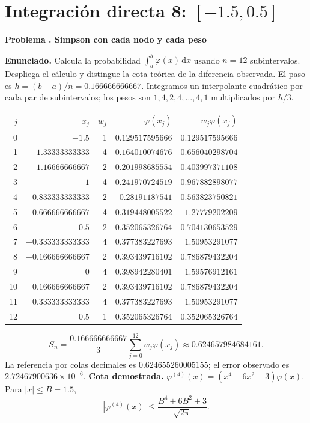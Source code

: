 \documentclass[11pt,a4paper]{article}
\newcommand{\dd}{\,\mathrm d}
\theoremstyle{definition}
\newcounter{problema}
\newenvironment{resuelto}[1]{\refstepcounter{problema}\par\medskip\Needspace{6\baselineskip}\textbf{Problema \theproblema. #1}\par}{\par\medskip}
\begin{document}
\section{\texorpdfstring{Integración directa 8: $[-1.5,0.5]$}{Integración directa 8: [-1.5,0.5]}}
\begin{resuelto}{Simpson con cada nodo y cada peso}
\textbf{Enunciado.} Calcula la probabilidad $\int_a^b\varphi(x)\dd x$ usando $n=12$ subintervalos. Despliega el cálculo y distingue la cota teórica de la diferencia observada.
El paso es $h=(b-a)/n=0.166666666667$. Integramos un interpolante cuadrático por cada par de subintervalos; los pesos son $1,4,2,4,\ldots,4,1$ multiplicados por $h/3$.

\begin{center}\small\begin{tabular}{rrrrr}
\toprule
$j$&$x_j$&$w_j$&$\varphi(x_j)$&$w_j\varphi(x_j)$\\
\midrule
0&$-1.5$&1&$0.129517595666$&$0.129517595666$\\
1&$-1.33333333333$&4&$0.164010074676$&$0.656040298704$\\
2&$-1.16666666667$&2&$0.201998685554$&$0.403997371108$\\
3&$-1$&4&$0.241970724519$&$0.967882898077$\\
4&$-0.833333333333$&2&$0.28191187541$&$0.563823750821$\\
5&$-0.666666666667$&4&$0.319448005522$&$1.27779202209$\\
6&$-0.5$&2&$0.352065326764$&$0.704130653529$\\
7&$-0.333333333333$&4&$0.377383227693$&$1.50953291077$\\
8&$-0.166666666667$&2&$0.393439716102$&$0.786879432204$\\
9&$0$&4&$0.398942280401$&$1.59576912161$\\
10&$0.166666666667$&2&$0.393439716102$&$0.786879432204$\\
11&$0.333333333333$&4&$0.377383227693$&$1.50953291077$\\
12&$0.5$&1&$0.352065326764$&$0.352065326764$\\
\bottomrule\end{tabular}\end{center}
\[
S_n=\frac{0.166666666667}{3}\sum_{j=0}^{12}w_j\varphi(x_j)\approx0.624657984684161.
\]
La referencia por colas decimales es $0.624655260005155$; el error observado es $2.72467900636\times10^{-6}$.
\textbf{Cota demostrada.} $\varphi^{(4)}(x)=(x^4-6x^2+3)\varphi(x)$. Para $|x|\le B=1.5$,
\[
|\varphi^{(4)}(x)|\le\frac{B^4+6B^2+3}{\sqrt{2\pi}}.
\]
\end{resuelto}
\end{document}
